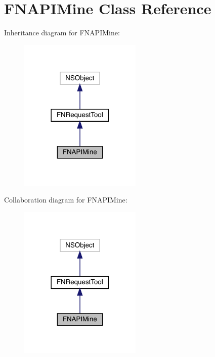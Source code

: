 \hypertarget{interface_f_n_a_p_i_mine}{}\section{F\+N\+A\+P\+I\+Mine Class Reference}
\label{interface_f_n_a_p_i_mine}


Inheritance diagram for F\+N\+A\+P\+I\+Mine\+:\nopagebreak
\begin{figure}[H]
\begin{center}
\leavevmode
\includegraphics[width=165pt]{interface_f_n_a_p_i_mine__inherit__graph}
\end{center}
\end{figure}


Collaboration diagram for F\+N\+A\+P\+I\+Mine\+:\nopagebreak
\begin{figure}[H]
\begin{center}
\leavevmode
\includegraphics[width=165pt]{interface_f_n_a_p_i_mine__coll__graph}
\end{center}
\end{figure}
